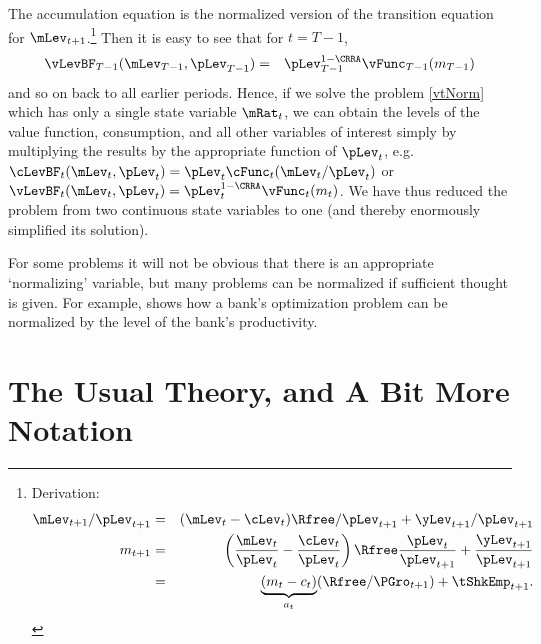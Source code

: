 \documentclass[titlepage]{\econtex}
\begin{document}
The accumulation equation is the normalized version of the transition
equation for $\mLev_{t+1}$.\footnote{Derivation:
\begin{eqnarray*}
        \mLev_{t+1}/\pLev_{t+1} & = & (\mLev_{t}-\cLev_{t})\Rfree/\pLev_{t+1} + {\yLev}_{t+1}/\pLev_{t+1}
\\      {m}_{t+1} & = & \left(\frac{\mLev_{t}}{\pLev_{t}} - \frac{\cLev_{t}}{\pLev_{t}}\right)\Rfree\frac{\pLev_{t}}{\pLev_{t+1}} + \frac{{\yLev}_{t+1}}{\pLev_{t+1}}
\\       & = & \underbrace{({m}_{t} - {c}_{t})}_{{a}_{t}}(\Rfree/\PGro_{t+1}) + \tShkEmp_{t+1}.
\end{eqnarray*}
}  Then it is easy to see that for $t=T-1$,
\begin{eqnarray*}
\vLevBF_{T-1}(\mLev_{T-1},\pLev_{T-1}) &=& \pLev_{T-1}^{1-\CRRA}\null{\vFunc}_{T-1}({m}_{T-1})
\end{eqnarray*}
and so on back to all earlier periods.  Hence, if we solve the problem \eqref{vtNorm}
which has only a single state variable $\mRat_{t}$, we can obtain the levels of
the value function, consumption, and all other variables of interest
simply by multiplying the results by
the appropriate function of $\pLev_{t}$, e.g.\ $\cLevBF_{t}(\mLev_{t},\pLev_{t})=\pLev_{t}\cFunc_{t}(\mLev_{t}/\pLev_{t})$ or $\vLevBF_{t}({\mLev}_{t},\pLev_{t}) = \pLev_{t}^{1-\CRRA}\vFunc_{t}({m}_{t})$.  We have thus reduced the
problem from two continuous state variables to one (and thereby enormously simplified its solution).

For some problems it will not be obvious that there is an appropriate
`normalizing' variable, but many problems can be normalized if
sufficient thought is given.  For example, \cite{valencia:2006} shows
how a bank's optimization problem can be normalized by the level of
the bank's productivity.


\hypertarget{The-Usual-Theory}{}
\section{The Usual Theory, and A Bit More Notation}
\label{sec:usualtheory}
\end{document}
